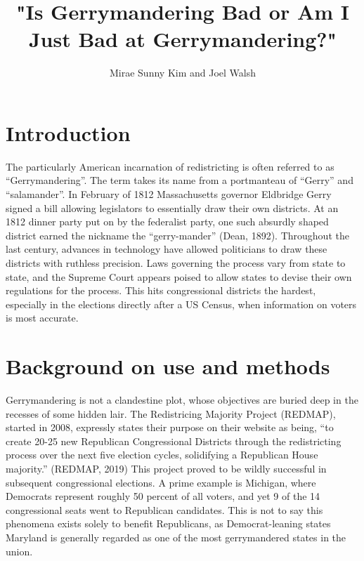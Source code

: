 \documentclass{article}
\begin{document}
\title{"Is Gerrymandering Bad or Am I Just Bad at Gerrymandering?"}
\author{Mirae Sunny Kim  and Joel Walsh }
\maketitle

\section{Introduction}
	\hspace{\parindent}
 The particularly American incarnation of redistricting is often referred to as “Gerrymandering”. The term takes its name from a portmanteau of “Gerry” and “salamander”. In February of 1812 Massachusetts governor Eldbridge Gerry signed a bill allowing legislators to essentially draw their own districts. At an 1812 dinner party put on by the federalist party, one such absurdly shaped district earned the nickname the “gerry-mander” (Dean, 1892). Throughout the last century, advances in technology have allowed politicians to draw these districts with ruthless precision. Laws governing the process vary from state to state, and the Supreme Court appears poised to allow states to devise their own regulations for the process. This hits congressional districts the hardest, especially in the elections directly after a US Census, when information on voters is most accurate. 


\section{Background on use and methods}
\hspace{\parindent}
Gerrymandering is not a clandestine plot, whose objectives are buried deep in the recesses of some hidden lair. The Redistricing Majority Project (REDMAP), started in 2008, expressly states their purpose  on their website as being, “to create 20-25 new Republican Congressional Districts through the redistricting process over the next five election cycles, solidifying a Republican House majority.” (REDMAP, 2019) This project proved to be wildly successful in subsequent congressional elections. A prime example is Michigan, where Democrats represent roughly 50 percent of all voters, and yet 9 of the 14 congressional seats went to Republican candidates. This is not to say this phenomena exists solely to benefit Republicans, as Democrat-leaning states Maryland is generally regarded as one of the most gerrymandered states in the union.
\end{document}
